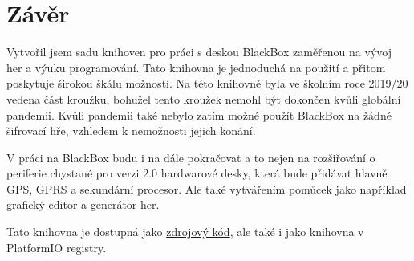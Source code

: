\chapter{Závěr}

Vytvořil jsem sadu knihoven pro práci s deskou BlackBox zaměřenou na vývoj her a výuku programování.
Tato knihovna je jednoduchá na použití a přitom poskytuje širokou škálu možností.
Na této knihovně byla ve školním roce 2019/20 vedena část kroužku, bohužel tento kroužek nemohl být dokončen kvůli globální pandemii.
Kvůli pandemii také nebylo zatím možné použít BlackBox na žádné šifrovací hře, vzhledem k nemožnosti jejich konání.

V práci na BlackBox budu i na dále pokračovat a to nejen na rozšiřování o periferie chystané pro verzi 2.0 hardwarové desky, která bude přidávat hlavně GPS, GPRS a sekundární procesor.
Ale také vytvářením pomůcek jako například grafický editor a generátor her.

Tato knihovna je dostupná jako \href{https://github.com/RoboticsBrno/BlackBox_library}{zdrojový kód}, ale také i jako knihovna v PlatformIO registry\cite{pio-registry}.